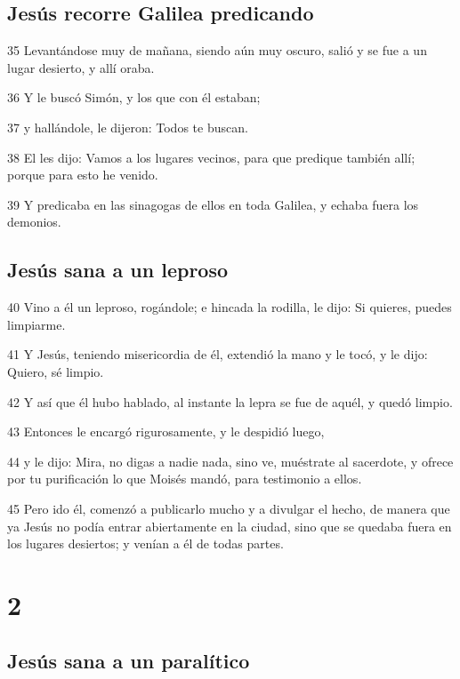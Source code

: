 \section*{Jesús recorre Galilea predicando}

\par 35 Levantándose muy de mañana, siendo aún muy oscuro, salió y se fue a un lugar desierto, y allí oraba.
\par 36 Y le buscó Simón, y los que con él estaban;
\par 37 y hallándole, le dijeron: Todos te buscan.
\par 38 El les dijo: Vamos a los lugares vecinos, para que predique también allí; porque para esto he venido.
\par 39 Y predicaba en las sinagogas de ellos en toda Galilea, y echaba fuera los demonios.

\section*{Jesús sana a un leproso}

\par 40 Vino a él un leproso, rogándole; e hincada la rodilla, le dijo: Si quieres, puedes limpiarme.
\par 41 Y Jesús, teniendo misericordia de él, extendió la mano y le tocó, y le dijo: Quiero, sé limpio.
\par 42 Y así que él hubo hablado, al instante la lepra se fue de aquél, y quedó limpio.
\par 43 Entonces le encargó rigurosamente, y le despidió luego,
\par 44 y le dijo: Mira, no digas a nadie nada, sino ve, muéstrate al sacerdote, y ofrece por tu purificación lo que Moisés mandó, para testimonio a ellos.
\par 45 Pero ido él, comenzó a publicarlo mucho y a divulgar el hecho, de manera que ya Jesús no podía entrar abiertamente en la ciudad, sino que se quedaba fuera en los lugares desiertos; y venían a él de todas partes.

\chapter{2}

\section*{Jesús sana a un paralítico}

